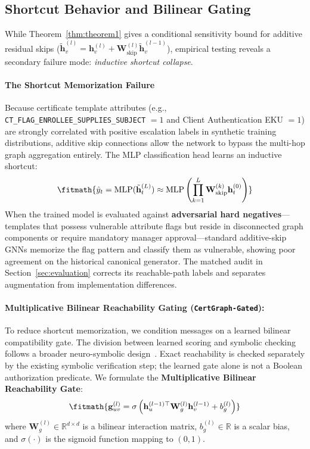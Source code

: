 \subsection{Shortcut Behavior and Bilinear Gating}
While Theorem~\ref{thm:theorem1} gives a conditional sensitivity bound for additive residual skips ($\tilde{\mathbf{h}}_v^{(l)} = \mathbf{h}_v^{(l)} + \mathbf{W}_{\text{skip}}^{(l)} \tilde{\mathbf{h}}_v^{(l-1)}$), empirical testing reveals a secondary failure mode: \textit{inductive shortcut collapse}.

\paragraph{The Shortcut Memorization Failure}
Because certificate template attributes (e.g., \texttt{CT\_FLAG\_ENROLLEE\_SUPPLIES\_SUBJECT} $= 1$ and Client Authentication EKU $= 1$) are strongly correlated with positive escalation labels in synthetic training distributions, additive skip connections allow the network to bypass the multi-hop graph aggregation entirely. The MLP classification head learns an inductive shortcut:
\begin{equation}
\fitmath{\hat{y}_t = \text{MLP}(\tilde{\mathbf{h}}_t^{(L)}) \approx \text{MLP} \left( \prod_{k=1}^L \mathbf{W}_{\text{skip}}^{(k)} \mathbf{h}_t^{(0)} \right)}
\end{equation}
When the trained model is evaluated against \textbf{adversarial hard negatives}—templates that possess vulnerable attribute flags but reside in disconnected graph components or require mandatory manager approval—standard additive-skip GNNs memorize the flag pattern and classify them as vulnerable, showing poor agreement on the historical canonical generator. The matched audit in Section~\ref{sec:evaluation} corrects its reachable-path labels and separates augmentation from implementation differences.

\paragraph{Multiplicative Bilinear Reachability Gating (\texttt{CertGraph-Gated}):}
To reduce shortcut memorization, we condition messages on a learned bilinear compatibility gate. The division between learned scoring and symbolic checking follows a broader neuro-symbolic design~\cite{garcez2023neurosymbolic}. Exact reachability is checked separately by the existing symbolic verification step; the learned gate alone is not a Boolean authorization predicate. We formulate the \textbf{Multiplicative Bilinear Reachability Gate}:
\begin{equation}
\fitmath{\mathbf{g}_{uv}^{(l)} = \sigma \left( \mathbf{h}_u^{(l-1)\top} \mathbf{W}_g^{(l)} \mathbf{h}_v^{(l-1)} + b_g^{(l)} \right)}
\end{equation}
where $\mathbf{W}_g^{(l)} \in \mathbb{R}^{d \times d}$ is a bilinear interaction matrix, $b_g^{(l)} \in \mathbb{R}$ is a scalar bias, and $\sigma(\cdot)$ is the sigmoid function mapping to $(0, 1)$.

